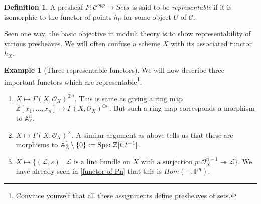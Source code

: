 \documentclass[11pt]{amsart}
\newcommand{\Spec}{{\rm Spec \,}}
\newcommand{\sL}{{\mathcal L}}
\newcommand{\sO}{{\mathcal O}}
\newcommand{\A}{{\mathbb A}}
\renewcommand{\P}{{\mathbb P}}
\newcommand{\Z}{{\mathbb Z}}
\theoremstyle{definition}
\newtheorem{definition}[theorem]{Definition}
\newtheorem{example}[theorem]{Example}
\begin{document}
\begin{definition}
	\label{definition-representable-functor}
	A presheaf $F : \mathcal{C}^{opp}\to \textit{Sets}$ is said
	to be {\it representable} if it is isomorphic to the functor of
	points $h_U$ for some object $U$ of $\mathcal{C}$.
\end{definition}

Seen one way, the basic objective in moduli theory is to show representability of various presheaves. We will often confuse a scheme $X$ with its associated functor $h_X$.

\begin{example}[Three representable functors] We will now describe three important functors which are representable\footnote{Convince yourself that all these assignments define presheaves of sets.}.
	\begin{enumerate}
		\item $X \mapsto \Gamma (X,\sO_X)^{\oplus n}$. This is same as giving a ring map $\Z[x_1,\ldots,x_n]\rightarrow \Gamma (X,\sO_X)^{\oplus n}$. But such a ring map corresponds a morphism to $\A_{\Z}^n$.
		\item $X \mapsto \Gamma (X,\sO_X)^{\times}$. A similar argument as above tells us that these are morphisms to $\A_{\Z}^1\setminus \{0\}:= \Spec \Z[t,t^{-1}]$.
		\item $X \mapsto \{ (\sL,s)\;|\; \text{$\sL$ is a line bundle on $X$ with a surjection}\; p:\sO_X^{n+1}\twoheadrightarrow \sL\}$. We have already seen in \ref{functor-of-Pn} that this is $\mathit{Hom}(-,\P^n)$.
	\end{enumerate}
\end{example}
\end{document}
